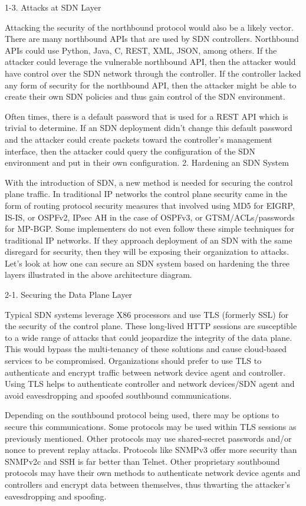 1-3. Attacks at SDN Layer

Attacking the security of the northbound protocol would also be a likely vector.  There are many northbound APIs that are used by SDN controllers.  Northbound APIs could use Python, Java, C, REST, XML, JSON, among others.  If the attacker could leverage the vulnerable northbound API, then the attacker would have control over the SDN network through the controller.  If the controller lacked any form of security for the northbound API, then the attacker might be able to create their own SDN policies and thus gain control of the SDN environment.

Often times, there is a default password that is used for a REST API which is trivial to determine.  If an SDN deployment didn’t change this default password and the attacker could create packets toward the controller’s management interface, then the attacker could query the configuration of the SDN environment and put in their own configuration.
2. Hardening an SDN System

With the introduction of SDN, a new method is needed for securing the control plane traffic.  In traditional IP networks the control plane security came in the form of routing protocol security measures that involved using MD5 for EIGRP, IS-IS, or OSPFv2, IPsec AH in the case of OSPFv3, or GTSM/ACLs/passwords for MP-BGP.  Some implementers do not even follow these simple techniques for traditional IP networks.  If they approach deployment of an SDN with the same disregard for security, then they will be exposing their organization to attacks.  Let’s look at how one can secure an SDN system based on hardening the three layers illustrated in the above architecture diagram.

2-1. Securing the Data Plane Layer

Typical SDN systems leverage X86 processors and use TLS (formerly SSL) for the security of the control plane.  These long-lived HTTP sessions are susceptible to a wide range of attacks that could jeopardize the integrity of the data plane.  This would bypass the multi-tenancy of these solutions and cause cloud-based services to be compromised.  Organizations should prefer to use TLS to authenticate and encrypt traffic between network device agent and controller.  Using TLS helps to authenticate controller and network devices/SDN agent and avoid eavesdropping and spoofed southbound communications.

Depending on the southbound protocol being used, there may be options to secure this communications.  Some protocols may be used within TLS sessions as previously mentioned.  Other protocols may use shared-secret passwords and/or nonce to prevent replay attacks.  Protocols like SNMPv3 offer more security than SNMPv2c and SSH is far better than Telnet.  Other proprietary southbound protocols may have their own methods to authenticate network device agents and controllers and encrypt data between themselves, thus thwarting the attacker’s eavesdropping and spoofing.


